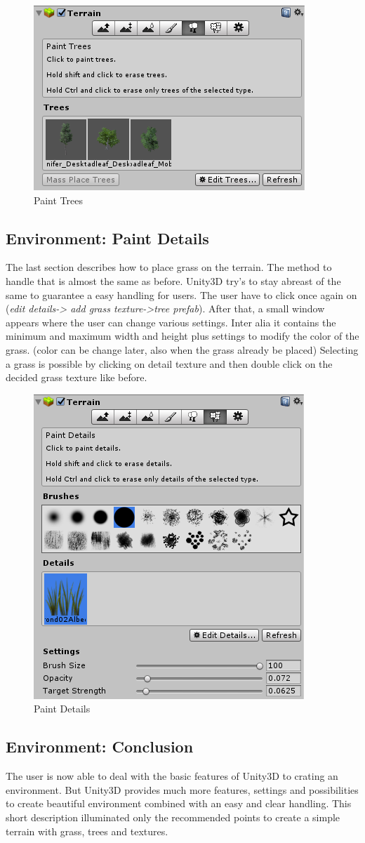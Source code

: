 \documentclass[conference]{IEEEtran}
\begin{document}
\begin{figure}[htbp]
  \includegraphics[width=.4\textwidth]{pictures/paint_trees}
  \caption{Paint Trees}
  \label{fig:paint_trees}
\end{figure}

\subsection{Environment: Paint Details}
The last section describes how to place grass on the terrain. The method to handle that is almost the same as before. Unity3D try’s to 
stay abreast of the same to guarantee a easy handling for users. The user have to click once again on (\emph{edit details-> add grass texture->tree prefab}). After that, a small window appears where the user can change various settings. Inter alia it contains the minimum and maximum width and height plus settings to modify the color of the grass. (color can be change later, also when the grass already be placed) Selecting a grass is possible by clicking on detail texture and then double click on the decided grass texture like before. 


\begin{figure}[htbp]
  \includegraphics[width=.4\textwidth]{pictures/paint_details}
  \caption{Paint Details}
  \label{fig:paint_details}
\end{figure}

\subsection{Environment: Conclusion}
The user is now able to deal with the basic features of Unity3D to crating an environment. But Unity3D provides much more features, settings and possibilities to create beautiful environment combined with an easy and clear handling. This short description illuminated only the recommended points to create a simple terrain with grass, trees and textures.
\end{document}
